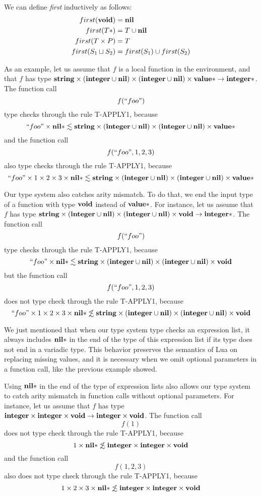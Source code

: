 We can define \emph{first} inductively as follows:
\begin{align*}
first(\mathbf{void}) & = \mathbf{nil}\\
first(T{*}) & = T \cup \mathbf{nil}\\
first(T \times P) & = T\\
first(S_{1} \sqcup S_{2}) & = first(S_{1}) \cup first(S_{2})
\end{align*}

As an example, let us assume that $f$ is a local function in the environment,
and that $f$ has type $\mathbf{string} \times (\mathbf{integer} \cup \mathbf{nil}) \times (\mathbf{integer} \cup \mathbf{nil}) \times \mathbf{value}{*} \rightarrow \mathbf{integer}{*}$.
The function call
\[
f(``foo")
\]
type checks through the rule \textsc{T-APPLY1}, because
\[
``foo" \times \mathbf{nil}{*} \lesssim \mathbf{string} \times (\mathbf{integer} \cup \mathbf{nil}) \times (\mathbf{integer} \cup \mathbf{nil}) \times \mathbf{value}{*}
\]
and the function call
\[
f(``foo",1,2,3)
\]
also type checks through the rule \textsc{T-APPLY1}, because
\[
``foo" \times 1 \times 2 \times 3 \times \mathbf{nil}{*} \lesssim \mathbf{string} \times (\mathbf{integer} \cup \mathbf{nil}) \times (\mathbf{integer} \cup \mathbf{nil}) \times \mathbf{value}{*}
\]

Our type system also catches arity mismatch.
To do that, we end the input type of a function with type $\mathbf{void}$
instead of $\mathbf{value}{*}$.
For instance, let us assume that $f$ has type
$\mathbf{string} \times (\mathbf{integer} \cup \mathbf{nil}) \times (\mathbf{integer} \cup \mathbf{nil}) \times \mathbf{void} \rightarrow \mathbf{integer}{*}$.
The function call
\[
f(``foo")
\]
type checks through the rule \textsc{T-APPLY1}, because
\[
``foo" \times \mathbf{nil}{*} \lesssim \mathbf{string} \times (\mathbf{integer} \cup \mathbf{nil}) \times (\mathbf{integer} \cup \mathbf{nil}) \times \mathbf{void}
\]
but the function call
\[
f(``foo",1,2,3)
\]
does not type check through the rule \textsc{T-APPLY1}, because
\[
``foo" \times 1 \times 2 \times 3 \times \mathbf{nil}{*} \not\lesssim \mathbf{string} \times (\mathbf{integer} \cup \mathbf{nil}) \times (\mathbf{integer} \cup \mathbf{nil}) \times \mathbf{void}
\]

We just mentioned that when our type system type checks an expression list,
it always includes $\mathbf{nil}{*}$ in the end of the type of this expression list
if its type does not end in a variadic type.
This behavior preserves the semantics of Lua on replacing missing values,
and it is necessary when we omit optional parameters in a function call,
like the previous example showed.

Using $\mathbf{nil}{*}$ in the end of the type of expression lists also allows
our type system to catch arity mismatch in function calls without optional parameters.
For instance, let us assume that $f$ has type
$\mathbf{integer} \times \mathbf{integer} \times \mathbf{void} \rightarrow \mathbf{integer} \times \mathbf{void}$.
The function call
\[
f(1)
\]
does not type check through the rule \textsc{T-APPLY1}, because
\[
1 \times \mathbf{nil}{*} \not\lesssim \mathbf{integer} \times \mathbf{integer} \times \mathbf{void}
\]
and the function call
\[
f(1,2,3)
\]
also does not type check through the rule \textsc{T-APPLY1}, because
\[
1 \times 2 \times 3 \times \mathbf{nil}{*} \not\lesssim \mathbf{integer} \times \mathbf{integer} \times \mathbf{void}
\]

